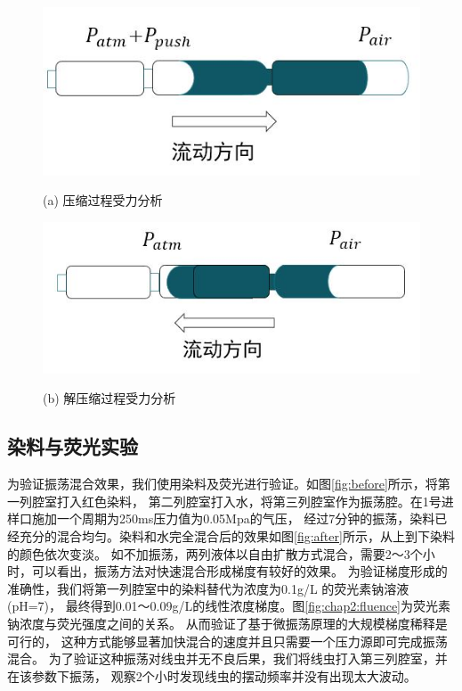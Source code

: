 	\begin{figure}[!htp]    
	\begin{minipage}[t]{0.5\linewidth}%
		\centering    
		\includegraphics[width=1\linewidth]{figure/chap2/force2.jpg}    
		\caption*{(a) 压缩过程受力分析}%
		\label{fig:angle}    
	\end{minipage}    
	\begin{minipage}[t]{0.5\linewidth}%
		\centering    
		\includegraphics[width=1\linewidth]{figure/chap2/force1.jpg}    
		\caption*{(b) 解压缩过程受力分析}
		\label{fig:decompress}
	\end{minipage}
	\label{fig:force}
	\end{figure}
	
\subsection{染料与荧光实验}
为验证振荡混合效果，我们使用染料及荧光进行验证。如图\ref{fig:before}所示，将第一列腔室打入红色染料，
第二列腔室打入水，将第三列腔室作为振荡腔。在1号进样口施加一个周期为250ms压力值为0.05Mpa的气压，
经过7分钟的振荡，染料已经充分的混合均匀。染料和水完全混合后的效果如图\ref{fig:after}所示，从上到下染料的颜色依次变淡。
如不加振荡，两列液体以自由扩散方式混合，需要2～3个小时，可以看出，振荡方法对快速混合形成梯度有较好的效果。
为验证梯度形成的准确性，我们将第一列腔室中的染料替代为浓度为0.1g/L 的荧光素钠溶液(pH=7)，
最终得到0.01～0.09g/L的线性浓度梯度。图\ref{fig:chap2:fluence}为荧光素钠浓度与荧光强度之间的关系。
从而验证了基于微振荡原理的大规模梯度稀释是可行的，
这种方式能够显著加快混合的速度并且只需要一个压力源即可完成振荡混合。
为了验证这种振荡对线虫并无不良后果，我们将线虫打入第三列腔室，并在该参数下振荡，
观察2个小时发现线虫的摆动频率并没有出现太大波动。

